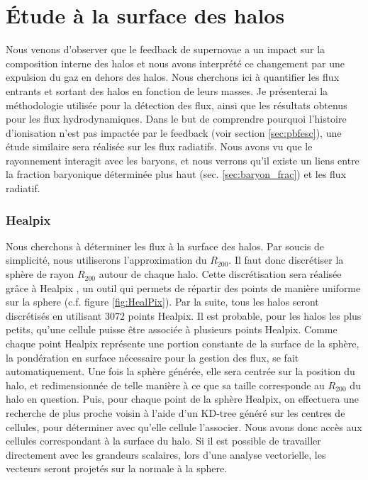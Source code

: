 \clearpage
\section{Étude à la surface des halos}

Nous venons d'observer que le feedback de supernovae a un impact sur la composition interne des halos et nous avons interprété ce changement par une expulsion du gaz en dehors des halos.
Nous cherchons ici à quantifier les flux entrants et sortant des halos en fonction de leurs masses.
Je présenterai la méthodologie utilisée pour la détection des flux, ainsi que les résultats obtenus pour les flux hydrodynamiques.
Dans le but de comprendre pourquoi l'histoire d'ionisation n'est pas impactée par le feedback (voir section \ref{sec:pbfesc}), une étude similaire sera réalisée sur les flux radiatifs.
Nous avons vu que le rayonnement interagit avec les baryons, et nous verrons qu'il existe un liens entre la fraction baryonique déterminée plus haut (sec. \ref{sec:baryon_frac}) et les flux radiatif.

\subsubsection{Healpix}
\label{sec:healpix}

Nous cherchons à déterminer les flux à la surface des halos.
Par soucis de simplicité, nous utiliserons l'approximation du $R_{200}$.
Il faut donc discrétiser la sphère de rayon $R_{200}$ autour de chaque halo.
Cette discrétisation sera réalisée grâce à Healpix \citep{gorski_healpix:_2005}, un outil qui permets de répartir des points de manière uniforme sur la sphere (c.f. figure \ref{fig:HealPix}).
Par la suite, tous les halos seront discrétisés en utilisant $3072$ points Healpix.
Il est probable, pour les halos les plus petits, qu'une cellule puisse être associée à plusieurs points Healpix.
Comme chaque point Healpix représente une portion constante de la surface de la sphère, la pondération en surface nécessaire pour la gestion des flux, se fait automatiquement.
Une fois la sphère générée, elle sera centrée sur la position du halo, et redimensionnée de telle manière à ce que sa taille corresponde au $R_{200}$ du halo en question.
Puis, pour chaque point de la sphère Healpix, on effectuera une recherche de plus proche voisin à l'aide d'un KD-tree généré sur les centres de cellules, pour déterminer avec qu'elle cellule l'associer.
Nous avons donc accès aux cellules correspondant à la surface du halo.
Si il est possible de travailler directement avec les grandeurs scalaires, lors d'une analyse vectorielle, les vecteurs seront projetés sur la normale à la sphere.

